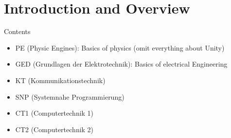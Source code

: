 \section{Introduction and Overview}

\begin{definition}{Contents}
    \begin{itemize}
        \item PE (Physic Engines): Basics of physics (omit everything about Unity)
        \item GED (Grundlagen der Elektrotechnik): Basics of electrical Engineering
        \item KT (Kommunikationstechnik)
        \item SNP (Systemnahe Programmierung)
        \item CT1 (Computertechnik 1)
        \item CT2 (Computertechnik 2)
    \end{itemize}
\end{definition}